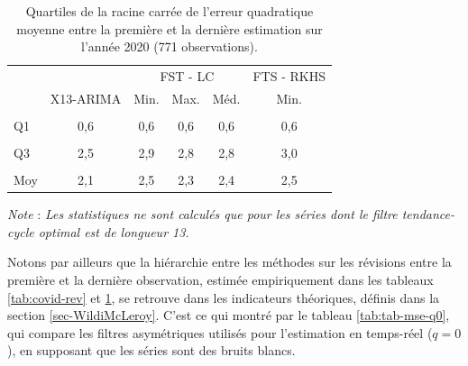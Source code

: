 \documentclass[
  11pt,
  french,
  a4paper]{article}
\newcommand\1{\mathds{1}}
\begin{document}
\begin{table}[!h]

\caption{\label{tab:covid-rev-fst}Quartiles de la racine carrée de l'erreur quadratique moyenne entre la première et la dernière estimation sur l'année 2020 (771 observations).}
\centering
\begin{tabular}[t]{lccccc}
\toprule
\multicolumn{2}{c}{ } & \multicolumn{3}{c}{FST - LC} & \multicolumn{1}{c}{FTS - RKHS} \\
\cmidrule(l{3pt}r{3pt}){3-5} \cmidrule(l{3pt}r{3pt}){6-6}
  & X13-ARIMA & Min. & Max. & Méd. & Min.\\
\midrule
\cellcolor{gray!6}{Min} & \cellcolor{gray!6}{0,1} & \cellcolor{gray!6}{0,1} & \cellcolor{gray!6}{0,1} & \cellcolor{gray!6}{0,1} & \cellcolor{gray!6}{0,1}\\
Q1 & 0,6 & 0,6 & 0,6 & 0,6 & 0,6\\
\cellcolor{gray!6}{Méd.} & \cellcolor{gray!6}{1,1} & \cellcolor{gray!6}{1,3} & \cellcolor{gray!6}{1,2} & \cellcolor{gray!6}{1,3} & \cellcolor{gray!6}{1,3}\\
Q3 & 2,5 & 2,9 & 2,8 & 2,8 & 3,0\\
\cellcolor{gray!6}{Max} & \cellcolor{gray!6}{25,0} & \cellcolor{gray!6}{31,5} & \cellcolor{gray!6}{30,2} & \cellcolor{gray!6}{29,8} & \cellcolor{gray!6}{31,9}\\
\addlinespace
Moy & 2,1 & 2,5 & 2,3 & 2,4 & 2,5\\
\bottomrule
\end{tabular}
\footnotesize


\emph{Note} : \emph{Les statistiques ne sont calculés que pour les séries dont le filtre tendance-cycle optimal est de longueur 13.}
\normalsize\end{table}

Notons par ailleurs que la hiérarchie entre les méthodes sur les révisions entre la première et la dernière observation, estimée empiriquement dans les tableaux \ref{tab:covid-rev} et \ref{tab:covid-rev-fst}, se retrouve dans les indicateurs théoriques, définis dans la section \ref{sec-WildiMcLeroy}. C'est ce qui montré par le tableau \ref{tab:tab-mse-q0}, qui compare les filtres asymétriques utilisés pour l'estimation en temps-réel (\(q=0\)), en supposant que les séries sont des bruits blancs.
\end{document}
